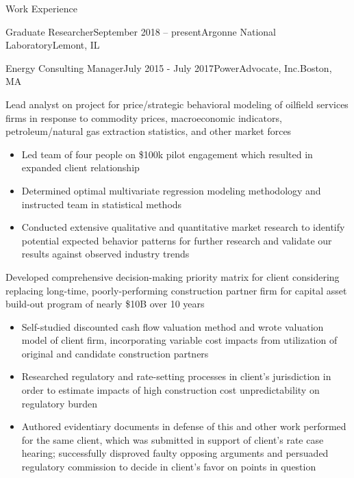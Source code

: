 \documentclass{resume} %
\begin{document}
\begin{rSection}{Work Experience}
\begin{rSubsection}{Graduate Researcher}{September 2018 -- present}{Argonne National Laboratory}{Lemont, IL}
\end{rSubsection}

\begin{rSubsection}{Energy Consulting Manager}{July 2015 - July 2017}{PowerAdvocate, Inc.}{Boston, MA}
  \setlength{\itemsep}{-5pt}
  \item Lead analyst on project for price/strategic behavioral modeling of oilfield services firms in response to commodity prices, macroeconomic indicators, petroleum/natural gas extraction statistics, and other market forces
  \begin{itemize}
    \item Led team of four people on \$100k pilot engagement which resulted in expanded client relationship
    \item Determined optimal multivariate regression modeling methodology and instructed team in statistical methods
    \item Conducted extensive qualitative and quantitative market research to identify potential expected behavior patterns for further research and validate our results against observed industry trends
  \end{itemize}
  \item Developed comprehensive decision-making priority matrix for client considering replacing long-time, poorly-performing construction partner firm for capital asset build-out program of nearly \$10B over 10 years
  \begin{itemize}
    \item Self-studied discounted cash flow valuation method and wrote valuation model of client firm, incorporating variable cost impacts from utilization of original and candidate construction partners
    \item Researched regulatory and rate-setting processes in client's jurisdiction in order to estimate impacts of high construction cost unpredictability on regulatory burden
    \item Authored evidentiary documents in defense of this and other work performed for the same client, which was submitted in support of client's rate case hearing; successfully disproved faulty opposing arguments and persuaded regulatory commission to decide in client's favor on points in question
  \end{itemize}
\end{rSubsection}



\end{rSection}
\end{document}

